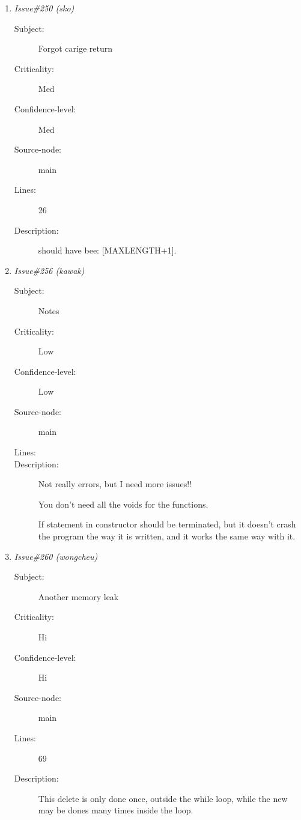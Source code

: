 \begin{enumerate}
\begin{description}
\item [Lines:] 26

\item [Description:] It should be MAXLENGTH + 1, where +1 is for the 
NULL, as was the convention set back at the constructor
\end{description}
\item {\it Issue\#250 (sko)}
\begin{description}
\item [Subject:] Forgot carige return
\item [Criticality:] Med
\item [Confidence-level:] Med
\item [Source-node:] main

\item [Lines:] 26

\item [Description:] should have bee: [MAXLENGTH+1].
\end{description}
\item {\it Issue\#256 (kawak)}
\begin{description}
\item [Subject:] Notes
\item [Criticality:] Low
\item [Confidence-level:] Low
\item [Source-node:] main

\item [Lines:] 

\item [Description:] Not really errors, but I need more issues!!


You don't need all the voids for the functions.

If statement in constructor should be terminated, but it doesn't crash the
program the way it is written, and it works the same way with it.
\end{description}
\item {\it Issue\#260 (wongcheu)}
\begin{description}
\item [Subject:] Another memory leak
\item [Criticality:] Hi
\item [Confidence-level:] Hi
\item [Source-node:] main

\item [Lines:] 69

\item [Description:] This delete is only done once, outside the while
loop, while the new may be dones many times inside the loop.
\end{description}
\end{enumerate}
